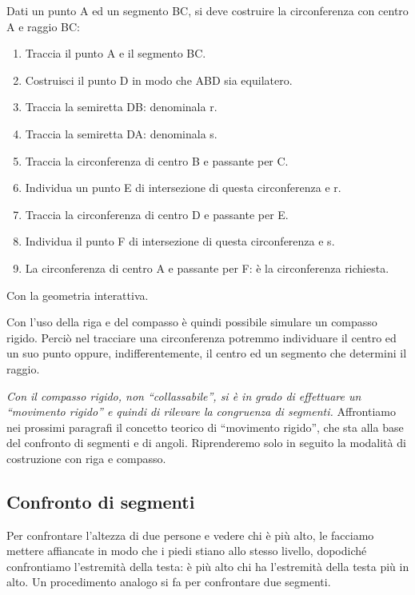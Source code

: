 \begin{procedura}\label{proc:fonda_comp_rig}
  Dati un punto A ed un segmento BC, si deve costruire la circonferenza con 
centro A e raggio BC:
  \begin{enumerate} [nosep]
    \item 
    Traccia il punto A e il segmento BC.
    \item 
    Costruisci il punto D in modo che ABD sia equilatero.
    \item 
    Traccia la semiretta DB: denominala r.
    \item 
    Traccia la semiretta DA: denominala s.
    \item 
    Traccia la circonferenza di centro B e passante per C.
    \item 
    Individua un punto E di intersezione di questa circonferenza e r.
    \item 
    Traccia la circonferenza di centro D e passante per E.
    \item 
    Individua il punto F di intersezione di questa circonferenza e s.
    \item 
    La circonferenza di centro A e passante per F: è la circonferenza 
richiesta.    
  \end{enumerate}
\end{procedura}

\ifcoding
Con la geometria interattiva.


\fi

Con l'uso della riga e del compasso è quindi possibile simulare un compasso 
rigido. 
Perciò nel tracciare una circonferenza potremmo individuare il centro ed un 
suo 
punto oppure, indifferentemente, il centro ed un segmento che determini il 
raggio.

\textit{Con il compasso rigido, non ``collassabile'', si è in grado di 
effettuare un ``movimento rigido'' e quindi di rilevare la congruenza di 
segmenti.}
Affrontiamo nei prossimi paragrafi il concetto teorico di ``movimento 
rigido'', 
che sta alla base del confronto di segmenti e di angoli. Riprenderemo solo 
in 
seguito la modalità di costruzione con riga e compasso.

\subsection{Confronto di segmenti}

Per confrontare l'altezza di due persone e vedere chi è più alto, le 
facciamo mettere affiancate in modo che i piedi stiano allo stesso 
livello, dopodiché confrontiamo l'estremità della testa: è più alto 
chi ha l'estremità della testa più in alto. Un procedimento analogo 
si fa per confrontare due segmenti.

